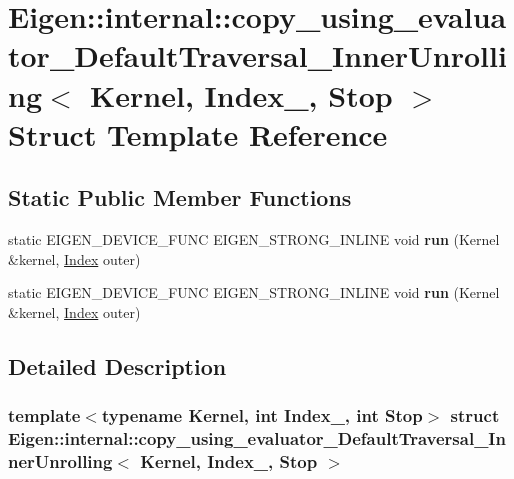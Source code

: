 \hypertarget{struct_eigen_1_1internal_1_1copy__using__evaluator___default_traversal___inner_unrolling}{}\section{Eigen\+:\+:internal\+:\+:copy\+\_\+using\+\_\+evaluator\+\_\+\+Default\+Traversal\+\_\+\+Inner\+Unrolling$<$ Kernel, Index\+\_\+, Stop $>$ Struct Template Reference}
\label{struct_eigen_1_1internal_1_1copy__using__evaluator___default_traversal___inner_unrolling}
\subsection*{Static Public Member Functions}
\begin{DoxyCompactItemize}
\item 
\mbox{\label{struct_eigen_1_1internal_1_1copy__using__evaluator___default_traversal___inner_unrolling_a4a3241ab24ef97eec46891b1488eb31e}} 
static E\+I\+G\+E\+N\+\_\+\+D\+E\+V\+I\+C\+E\+\_\+\+F\+U\+NC E\+I\+G\+E\+N\+\_\+\+S\+T\+R\+O\+N\+G\+\_\+\+I\+N\+L\+I\+NE void {\bfseries run} (Kernel \&kernel, \hyperlink{namespace_eigen_a62e77e0933482dafde8fe197d9a2cfde}{Index} outer)
\item 
\mbox{\label{struct_eigen_1_1internal_1_1copy__using__evaluator___default_traversal___inner_unrolling_a4a3241ab24ef97eec46891b1488eb31e}} 
static E\+I\+G\+E\+N\+\_\+\+D\+E\+V\+I\+C\+E\+\_\+\+F\+U\+NC E\+I\+G\+E\+N\+\_\+\+S\+T\+R\+O\+N\+G\+\_\+\+I\+N\+L\+I\+NE void {\bfseries run} (Kernel \&kernel, \hyperlink{namespace_eigen_a62e77e0933482dafde8fe197d9a2cfde}{Index} outer)
\end{DoxyCompactItemize}


\subsection{Detailed Description}
\subsubsection*{template$<$typename Kernel, int Index\+\_\+, int Stop$>$\newline
struct Eigen\+::internal\+::copy\+\_\+using\+\_\+evaluator\+\_\+\+Default\+Traversal\+\_\+\+Inner\+Unrolling$<$ Kernel, Index\+\_\+, Stop $>$}




